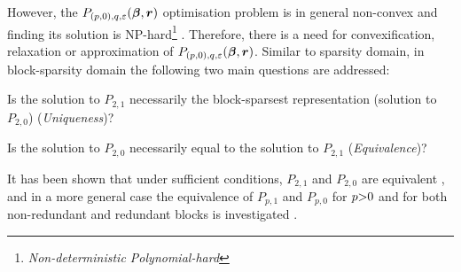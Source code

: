 However, the $P_{(p,0),q,\varepsilon}(\boldsymbol{\beta},\boldsymbol{r})$ optimisation problem is in general non-convex and finding its solution is NP-hard\footnote{\emph{Non-deterministic Polynomial-hard}} \cite{Natarajan1995,Amaldi1998}.
Therefore, there is a need for convexification, relaxation or approximation of $P_{(p,0),q,\varepsilon}(\boldsymbol{\beta},\boldsymbol{r})$.
Similar to sparsity domain, in block-sparsity domain the following two main questions are addressed:
\begin{list}{Q:}{}
\item Is the solution to $P_{2,1}$ necessarily the block-sparsest representation (solution to $P_{2,0}$) (\emph{Uniqueness})?\\
\item Is the solution to $P_{2,0}$ necessarily equal to the solution to $P_{2,1}$ (\emph{Equivalence})?
\end{list}
It has been shown that under sufficient conditions, $P_{2,1}$ and $P_{2,0}$ are equivalent \cite{Eldar2009b,Eldar2009c,Stojnic2009a,Eldar2010b,Eldar2010}, and in a more general case the equivalence of $P_{p,1}$ and $P_{p,0}$ for $p {>} 0$ and for both non-redundant and redundant blocks is investigated \cite{Elhamifar2011,Elhamifar2012b}.

